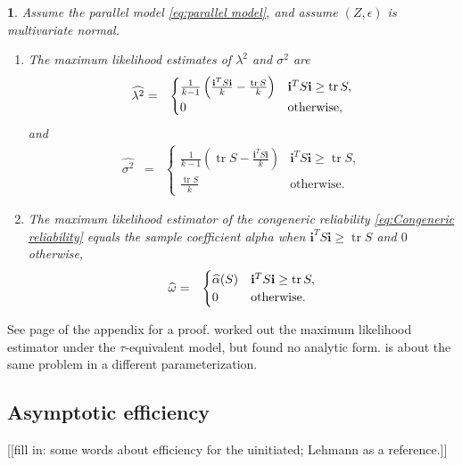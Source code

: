 \documentclass{article}
\makeatletter
\theoremstyle{plain}
\newtheorem{thm}{\protect\theoremname}
\theoremstyle{plain}
\theoremstyle{definition}
\theoremstyle{remark}
\theoremstyle{definition}
\theoremstyle{plain}
\theoremstyle{plain}
\theoremstyle{definition}
\newenvironment{proof}[1][\protect\proofname]{\par
	\normalfont\topsep6\p@\@plus6\p@\relax
	\trivlist
	\itemindent\parindent
	\item[\hskip\labelsep\scshape #1]\ignorespaces
}{%
	\endtrivlist\@endpefalse
}
\providecommand{\proofname}{Proof}
\providecommand{\theoremname}{Theorem}
\DeclareMathOperator{\tr}{tr}
\makeatother
\begin{document}
\begin{thm}\label{thm:ML}
Assume the parallel model \eqref{eq:parallel model}, and assume $(Z,\epsilon)$ is multivariate normal. 
\begin{enumerate}[label=(\roman*)]
\item The maximum likelihood estimates of $\lambda^{2}$
and $\sigma^{2}$ are 
\begin{eqnarray*}
\widehat{\lambda^{2}} & = & \begin{cases}
\frac{1}{k-1}\left(\frac{\mathbf{i}^{T}S\mathbf{i}}{k}-\frac{\tr{S}}{k}\right) & \mathbf{i}^{T}S\mathbf{i}\geq\tr{S},\\
0 & \text{\textrm{otherwise}},
\end{cases}\\
\end{eqnarray*}
and
\begin{eqnarray*}
\widehat{\sigma^{2}} & = & \begin{cases}
\frac{1}{k-1}\left(\tr{S}-\frac{\mathbf{i}^{T}S\mathbf{i}}{k}\right) & \mathbf{i}^{T}S\mathbf{i}\geq\tr{S},\\
\frac{\tr{S}}{k} & \textrm{otherwise}.
\end{cases}
\end{eqnarray*}
\item The maximum likelihood estimator of the congeneric reliability
\eqref{eq:Congeneric reliability} equals the sample coefficient alpha
when $\mathbf{i}^{T}S\mathbf{i}\geq\tr{S}$ and $0$ otherwise,
\begin{eqnarray*}
\widehat{\omega} & = & \begin{cases}
\widehat{\alpha}(S) & \mathbf{i}^{T}S\mathbf{i}\geq\tr{S},\\
0 & \text{\textrm{otherwise}}.
\end{cases}
\end{eqnarray*}
\end{enumerate}
\end{thm}
\begin{proof}
See page \pageref{proof:ML} of the appendix for a proof. \citet[][section 3 -- 5]{Kristof1969-ou} worked out the maximum likelihood estimator under the $\tau$-equivalent model, but found no analytic form. \citep[][Exercise 3.9, p. 114]{Muirhead2009-kq} is about the same problem in a different parameterization.
\end{proof}

\subsection{Asymptotic efficiency}
[[fill in: some words about efficiency for the uinitiated; Lehmann as a reference.]]
\end{document}
